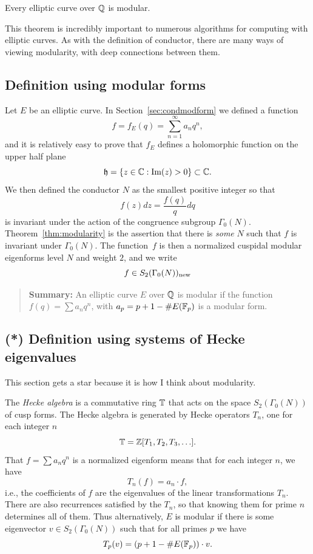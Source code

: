\documentclass{book}
\begin{document}
\begin{theorem}\label{thm:modularity}
Every elliptic curve over $\mathbb{Q}$ is modular.
\end{theorem}
This theorem is incredibly
important to numerous algorithms for computing with elliptic curves.
As with the definition of conductor, there
are many
ways of viewing modularity, with deep connections between them.

\subsection{Definition using modular forms}

Let $E$ be an elliptic curve.
In Section~\ref{sec:condmodform} we defined a function
$$
f = f_E(q) = \sum_{n=1}^{\infty} a_n q^n,
$$
and it is relatively easy to prove that $f_E$ defines
a holomorphic function on the upper half plane
$$
  \mathfrak{h} = \{z \in \mathbb{C} : \operatorname{Im}(z) > 0\} \subset \mathbb{C}.
$$
We then defined the conductor $N$ as the smallest positive
integer so that
$$f(z)dz = \frac{f(q)}{q} dq$$
is invariant
under the action of the congruence subgroup
$\Gamma_0(N)$.   Theorem~\ref{thm:modularity} is  the assertion
that there is {\em some} $N$ such that $f$ is invariant under $\Gamma_0(N)$.
The function~$f$ is then a normalized cuspidal
modular eigenforms level $N$ and weight $2$, and we write
$$
 f \in S_2(\Gamma_0(N))_{\operatorname{new}}
$$




\begin{quote}
{\bf Summary:} An elliptic curve $E$ over $\mathbb{Q}$ is modular if
the function $f(q) = \sum a_n q^n$, with $a_p = p+1-\#E(\mathbb{F}_p)$
is a modular form.
\end{quote}

\subsection{(*) Definition using systems of Hecke eigenvalues}\label{sec:modhecke}
This section gets a star because it is how I think about
modularity.

The {\em Hecke algebra} is a commutative ring $\mathbb{T}$ that acts on
the space $S_2(\Gamma_0(N))$ of cusp forms. The Hecke algebra
is generated by Hecke operators $T_n$, one for each integer $n$
$$
  \mathbb{T} = \mathbb{Z}[T_1, T_2, T_3, \ldots].
$$
That $f=\sum a_n q^n$ is a normalized eigenform means that  for each
integer $n$, we have
$$
  T_n(f) = a_n \cdot f,
$$
i.e., the coefficients of $f$ are the eigenvalues of the linear
transformations $T_n$.  There are also recurrences satisfied
by the $T_n$, so that knowing them for prime $n$ determines
all of them.
Thus alternatively, $E$ is modular if there is some eigenvector
$v \in S_2(\Gamma_0(N))$ such that for all primes $p$ we have
$$
  T_p(v) = (p+1 - \# E(\mathbb{F}_p)) \cdot v.
$$
\end{document}
